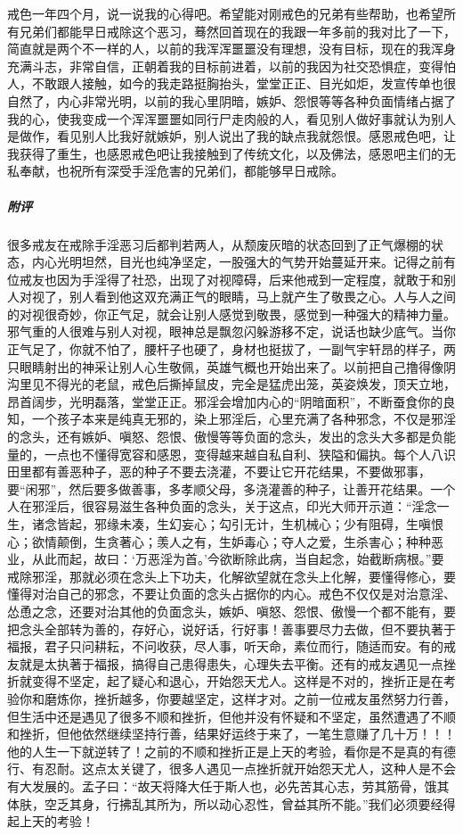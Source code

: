 \begin{case}
    戒色一年四个月，说一说我的心得吧。希望能对刚戒色的兄弟有些帮助，也希望所有兄弟们都能早日戒除这个恶习，蓦然回首现在的我跟一年多前的我对比了一下，简直就是两个不一样的人，以前的我浑浑噩噩没有理想，没有目标，现在的我浑身充满斗志，非常自信，正朝着我的目标前进着，以前的我因为社交恐惧症，变得怕人，不敢跟人接触，如今的我走路挺胸抬头，堂堂正正、目光如炬，发宣传单也很自然了，内心非常光明，以前的我心里阴暗，嫉妒、怨恨等等各种负面情绪占据了我的心，使我变成一个浑浑噩噩如同行尸走肉般的人，看见别人做好事就认为别人是做作，看见别人比我好就嫉妒，别人说出了我的缺点我就怨恨。感恩戒色吧，让我获得了重生，也感恩戒色吧让我接触到了传统文化，以及佛法，感恩吧主们的无私奉献，也祝所有深受手淫危害的兄弟们，都能够早日戒除。
    \subparagraph{附评} 很多戒友在戒除手淫恶习后都判若两人，从颓废灰暗的状态回到了正气爆棚的状态，内心光明坦然，目光也纯净坚定，一股强大的气势开始蔓延开来。记得之前有位戒友也因为手淫得了社恐，出现了对视障碍，后来他戒到一定程度，就敢于和别人对视了，别人看到他这双充满正气的眼睛，马上就产生了敬畏之心。人与人之间的对视很奇妙，你正气足，就会让别人感觉到敬畏，感觉到一种强大的精神力量。邪气重的人很难与别人对视，眼神总是飘忽闪躲游移不定，说话也缺少底气。当你正气足了，你就不怕了，腰杆子也硬了，身材也挺拔了，一副气宇轩昂的样子，两只眼睛射出的神采让别人心生敬佩，英雄气概也开始出来了。以前把自己撸得像阴沟里见不得光的老鼠，戒色后撕掉鼠皮，完全是猛虎出笼，英姿焕发，顶天立地，昂首阔步，光明磊落，堂堂正正。邪淫会增加内心的“阴暗面积”，不断蚕食你的良知，一个孩子本来是纯真无邪的，染上邪淫后，心里充满了各种邪念，不仅是邪淫的念头，还有嫉妒、嗔怒、怨恨、傲慢等等负面的念头，发出的念头大多都是负能量的，一点也不懂得宽容和感恩，变得越来越自私自利、狭隘和偏执。每个人八识田里都有善恶种子，恶的种子不要去浇灌，不要让它开花结果，不要做邪事，要“闲邪”，然后要多做善事，多孝顺父母，多浇灌善的种子，让善开花结果。一个人在邪淫后，很容易滋生各种负面的念头，关于这点，印光大师开示道：“淫念一生，诸念皆起，邪缘未凑，生幻妄心；勾引无计，生机械心；少有阻碍，生嗔恨心；欲情颠倒，生贪著心；羡人之有，生妒毒心；夺人之爱，生杀害心；种种恶业，从此而起，故曰：‘万恶淫为首。’今欲断除此病，当自起念，始截断病根。”要戒除邪淫，那就必须在念头上下功夫，化解欲望就在念头上化解，要懂得修心，要懂得对治自己的邪念，不要让负面的念头占据你的内心。戒色不仅仅是对治意淫、怂恿之念，还要对治其他的负面念头，嫉妒、嗔怒、怨恨、傲慢一个都不能有，要把念头全部转为善的，存好心，说好话，行好事！善事要尽力去做，但不要执著于福报，君子只问耕耘，不问收获，尽人事，听天命，素位而行，随适而安。有的戒友就是太执著于福报，搞得自己患得患失，心理失去平衡。还有的戒友遇见一点挫折就变得不坚定，起了疑心和退心，开始怨天尤人。这样是不对的，挫折正是在考验你和磨炼你，挫折越多，你要越坚定，这样才对。之前一位戒友虽然努力行善，但生活中还是遇见了很多不顺和挫折，但他并没有怀疑和不坚定，虽然遭遇了不顺和挫折，但他依然继续坚持行善，结果好运终于来了，一笔生意赚了几十万！！！他的人生一下就逆转了！之前的不顺和挫折正是上天的考验，看你是不是真的有德行、有忍耐。这点太关键了，很多人遇见一点挫折就开始怨天尤人，这种人是不会有大发展的。孟子曰：“故天将降大任于斯人也，必先苦其心志，劳其筋骨，饿其体肤，空乏其身，行拂乱其所为，所以动心忍性，曾益其所不能。”我们必须要经得起上天的考验！
\end{case}


